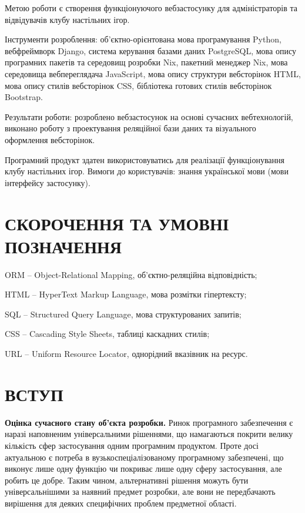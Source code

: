 \documentclass[a4paper, 14pt]{extarticle}
\begin{document}
  Метою роботи є створення функціонуючого вебзастосунку для адміністраторів та
  відвідувачів клубу настільних ігор.

  Інструменти розроблення: об'єктно-орієнтована мова програмування Python,
  вебфреймворк Django, система керування базами даних PostgreSQL, мова опису програмних
  пакетів та середовищ розробки Nix, пакетний менеджер Nix,
  мова середовища вебпереглядача JavaScript, мова
  опису структури вебсторінок HTML, мова опису стилів вебсторінок CSS, бібліотека
  готових стилів вебсторінок Bootstrap.

  Результати роботи: розроблено вебзастосунок на основі сучасних вебтехнологій,
  виконано роботу з проектування реляційної бази даних та візуального оформлення
  вебсторінок.

  Програмний продукт здатен використовуватись для реалізації функціонування
  клубу настільних ігор. Вимоги до користувачів: знання української мови (мови
  інтерфейсу застосунку).

  \clearpage
  \tableofcontents\thispagestyle{myheadings}

  \clearpage
  \section{СКОРОЧЕННЯ ТА УМОВНІ ПОЗНАЧЕННЯ}
  ORM -- Object-Relational Mapping, об'єктно-реляційна відповідність;

  HTML -- HyperText Markup Language, мова розмітки гіпертексту;

  SQL -- Structured Query Language, мова структурованих запитів;

  CSS -- Cascading Style Sheets, таблиці каскадних стилів;

  URL -- Uniform Resource Locator, однорідний вказівник на ресурс.

  \clearpage
  \section{ВСТУП}

  \textbf{Оцінка сучасного стану об'єкта розробки.}
  Ринок програмного забезпечення є наразі наповненим універсальними рішеннями,
  що намагаються покрити велику кількість сфер застосування одним програмним
  продуктом. Проте досі актуальною є потреба в вузькоспеціалізованому програмному
  забезпечені, що виконує лише одну функцію чи покриває лише одну сферу застосування,
  але робить це добре. Таким чином, альтернативні рішення можуть бути універсальнішими
  за наявний предмет розробки, але вони не передбачають вирішення
  для деяких специфічних проблем предметної області.
\end{document}
